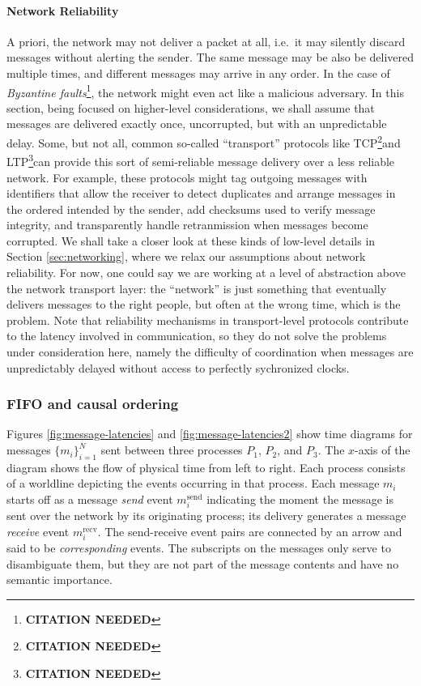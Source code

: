 \documentclass[]             %
{NASA}                       %
\theoremstyle{definition}
\newcommand{\citationneeded}{\footnote{\textbf{CITATION NEEDED}}}
\begin{document}
\paragraph{Network Reliability}
A priori, the network may not deliver a packet at all, i.e.~it may
silently discard messages without alerting the sender. The same
message may be also be delivered multiple times, and different
messages may arrive in any order. In the case of \emph{Byzantine
faults}\citationneeded, the network might even act like a malicious
adversary. In this section, being focused on higher-level
considerations, we shall assume that messages are delivered exactly
once, uncorrupted, but with an unpredictable delay. Some, but not all,
common so-called ``transport'' protocols like TCP\citationneeded and
LTP\citationneeded can provide this sort of semi-reliable message
delivery over a less reliable network. For example, these protocols
might tag outgoing messages with identifiers that allow the receiver
to detect duplicates and arrange messages in the ordered intended by
the sender, add checksums used to verify message integrity, and
transparently handle retranmission when messages become corrupted. We
shall take a closer look at these kinds of low-level details in
Section \ref{sec:networking}, where we relax our assumptions about
network reliability. For now, one could say we are working at a level
of abstraction above the network transport layer: the ``network'' is
just something that eventually delivers messages to the right people,
but often at the wrong time, which is the problem. Note that
reliability mechanisms in transport-level protocols contribute to the
latency involved in communication, so they do not solve the problems
under consideration here, namely the difficulty of coordination when
messages are unpredictably delayed without access to perfectly
sychronized clocks.

\subsubsection{FIFO and causal ordering}

Figures \ref{fig:message-latencies} and \ref{fig:message-latencies2}
show time diagrams for messages $\{m_i\}_{i=1}^N$ sent between three
processes $P_1$, $P_2$, and $P_3$. The $x$-axis of the diagram shows
the flow of physical time from left to right. Each process consists of
a worldline depicting the events occurring in that process. Each
message $m_i$ starts off as a message \emph{send} event
$m_i^\textrm{send}$ indicating the moment the message is sent over the
network by its originating process; its delivery generates a message
\emph{receive} event $m_i^\textrm{recv}$. The send-receive event pairs
are connected by an arrow and said to be \emph{corresponding}
events. The subscripts on the messages only serve to disambiguate
them, but they are not part of the message contents and have no
semantic importance.
\end{document}
